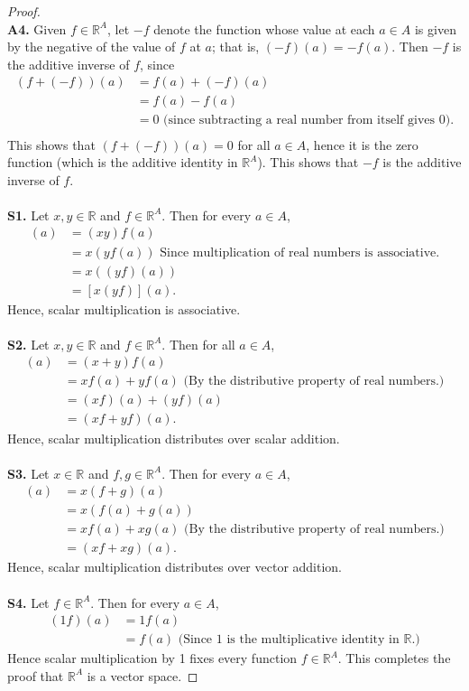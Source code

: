 \documentclass[12pt,letterpaper,reqno]{article}
\numberwithin{equation}{section}
\begin{document}
\begin{proof}
\\
{\bf A4.} Given $f \in \mathbb{R}^A$, let $-f$ denote the function whose value at each $a \in A$ is given by the negative of the value of $f$ at $a$; that is, $(-f)(a)=-f(a)$. Then $-f$ is the additive inverse of $f$, since
\begin{align*}
	(f+(-f))(a)&=f(a)+(-f)(a) \\
	&=f(a)-f(a) \\
	&=0 \text{ (since subtracting a real number from itself gives 0).}\\
\end{align*}
This shows that $(f+(-f))(a)=0$ for all $a \in A$, hence it is the zero function (which is the additive identity in $\mathbb{R}^A$). This shows that $-f$ is the additive inverse of $f$. \\
\\
{\bf S1.} Let $x,y \in \mathbb{R}$ and $f \in \mathbb{R}^A$. Then for every $a \in A$, 
\begin{align*}
	[(xy)f](a)&=(xy)f(a) \\
	&=x(yf(a)) \text{ Since multiplication of real numbers is associative.} \\
	&=x((yf)(a)) \\
	&=[x(yf)](a).
\end{align*}
Hence, scalar multiplication is associative. \\
\\
{\bf S2.} Let $x,y \in \mathbb{R}$ and $f \in \mathbb{R}^A$. Then for all $a \in A$,
\begin{align*}
	[(x+y)f](a)&=(x+y)f(a) \\
	&=xf(a)+yf(a) \text{ (By the distributive property of real numbers.)}\\
	&=(xf)(a)+(yf)(a) \\
	&=(xf+yf)(a).
\end{align*}
Hence, scalar multiplication distributes over scalar addition. \\
\\
{\bf S3.} Let $x \in \mathbb{R}$ and $f,g \in \mathbb{R}^A$. Then for every $a \in A$,
\begin{align*}
	[x(f+g)](a)&=x(f+g)(a) \\
	&=x(f(a)+g(a)) \\
	&=xf(a)+xg(a) \text{ (By the distributive property of real numbers.)}\\
	&=(xf+xg)(a).
\end{align*}
Hence, scalar multiplication distributes over vector addition. \\
\\
{\bf S4.} Let $f \in \mathbb{R}^A$. Then for every $a \in A$,
\begin{align*}
	(1f)(a)&=1f(a) \\
	&=f(a) \text{ (Since 1 is the multiplicative identity in $\mathbb{R}$.)}
\end{align*}
Hence scalar multiplication by 1 fixes every function $f \in \mathbb{R}^A$. This completes the proof that $\mathbb{R}^A$ is a vector space.
\end{proof}
\end{document}
